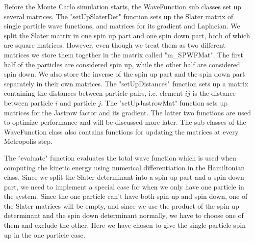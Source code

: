 \documentclass[../main.tex]{subfiles}
\begin{document}
Before the Monte Carlo simulation starts, the WaveFunction sub classes set up several matrices. The "setUpSlaterDet" function sets up the Slater matrix of single particle wave functions, and matrices for its gradient and Laplacian. We split the Slater matrix in one spin up part and one spin down part, both of which are square matrices. However, even though we treat them as two different matrices we store them together in the matrix called "m\_SPWFMat". The first half of the particles are considered spin up, while the other half are considered spin down. We also store the inverse of the spin up part and the spin down part separately in their own matrices. The "setUpDistances" function sets up a matrix containing the distances between particle pairs, i.e. element $ij$ is the distance between particle $i$ and particle $j$. The "setUpJastrowMat" function sets up matrices for the Jastrow factor and its gradient. The latter two functions are used to optimize performance and will be discussed more later. The sub classes of the WaveFunction class also contains functions for updating the matrices at every Metropolis step. 

The "evaluate" function evaluates the total wave function which is used when computing the kinetic energy using numerical differentiation in the Hamiltonian class. Since we split the Slater determinant into a spin up part and a spin down part, we need to implement a special case for when we only have one particle in the system. Since the one particle can't have both spin up and spin down, one of the Slater matrices will be empty, and since we use the product of the spin up determinant and the spin down determinant normally, we have to choose one of them and exclude the other. Here we have chosen to give the single particle spin up in the one particle case.
\end{document}
